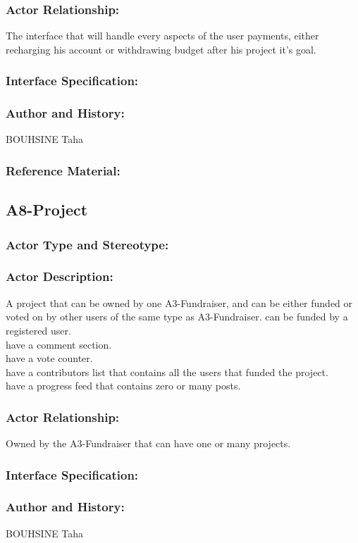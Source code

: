 \documentclass[11pt, openany]{report}
\begin{document}
\subsubsection{Actor Relationship:}
The interface that will handle every aspects of the user payments, either recharging his account or withdrawing budget after his project it's goal.
\subsubsection{Interface Specification:}
\subsubsection{Author and History:}
BOUHSINE Taha
\subsubsection{Reference Material:}

\clearpage
\subsection{A8-Project}
\label{A8}
\subsubsection{Actor Type and Stereotype:}
\subsubsection{Actor Description:}
A project that can be owned by one A3-Fundraiser, and can be either funded or voted on by other users of the same type as A3-Fundraiser.
can be funded by a registered user.\\
have a comment section.\\
have a vote counter.\\
have a contributors list that contains all the users that funded the project.\\
have a progress feed that contains zero or many posts.
\subsubsection{Actor Relationship:}
Owned by the A3-Fundraiser that can have one or many projects.
\subsubsection{Interface Specification:}
\subsubsection{Author and History:}
BOUHSINE Taha
\end{document}
